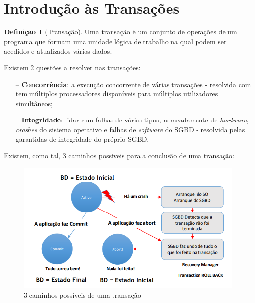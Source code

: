 \documentclass[oneside]{book}
\theoremstyle{definition}
\newtheorem{definition}{Definição}
\begin{document}
\section{Introdução às Transações}
\begin{definition}[Transação]
    Uma transação é um conjunto de operações de um programa que formam uma unidade lógica de trabalho na qual podem ser acedidos e atualizados vários dados.
\end{definition}
Existem 2 questões a resolver nas transações:
\begin{itemize}
    \itemsep0cm
    \item[--] \textbf{Concorrência}: a execução concorrente de várias transações - resolvida com tem múltiplos processadores disponíveis para múltiplos utilizadores simultâneos;
    \item[--] \textbf{Integridade}: lidar com falhas de vários tipos, nomeadamente de \textit{hardware}, \textit{crashes} do sistema operativo e falhas de \textit{software} do SGBD - resolvida pelas garantidas de integridade do próprio SGBD.
\end{itemize}

Existem, como tal, 3 caminhos possíveis para a conclusão de uma transação:
\begin{figure}[H]
    \centering
    \includegraphics[scale = 0.4]{cap_transct/caminhos_transacoes.png}
    \caption{3 caminhos possíveis de uma transação}
\end{figure}
\end{document}
